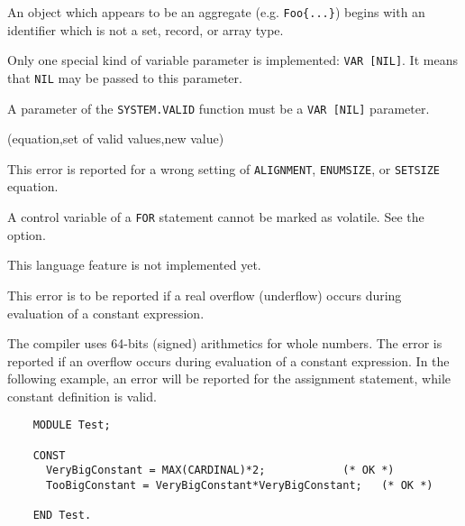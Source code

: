 
An object which appears to be an aggregate  (e.g. \verb'Foo{...}') begins with
an identifier which is not a set, record, or array type.


Only one special kind of variable parameter is implemented: \verb'VAR [NIL]'.
It means that \verb'NIL' may be passed to this parameter.


A parameter of the \verb'SYSTEM.VALID' function must be a \verb'VAR [NIL]' parameter.

(equation,set of valid values,new value)

This error is reported for a wrong setting of \verb'ALIGNMENT', \verb'ENUMSIZE',
or \verb'SETSIZE' equation.


A control variable of a \verb'FOR' statement cannot be marked as volatile. See
the  option.


This language feature is not implemented yet.


This error is to be reported if a real overflow (underflow) occurs during
evaluation of a constant expression.


The compiler uses 64-bits (signed) arithmetics for whole numbers.  The
error is reported if an overflow occurs during evaluation of
a constant expression. In the following example, an error will be reported
for the assignment statement, while constant definition is valid.

\begin{verbatim}
    MODULE Test;

    CONST
      VeryBigConstant = MAX(CARDINAL)*2;            (* OK *)
      TooBigConstant = VeryBigConstant*VeryBigConstant;   (* OK *)

    END Test.
\end{verbatim}


